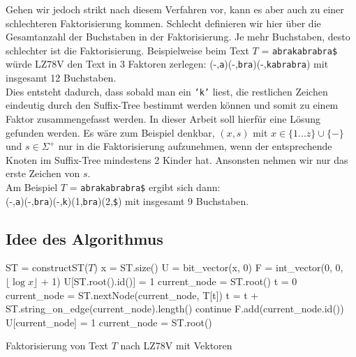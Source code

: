 \documentclass[a4paper,11pt]{scrartcl}%
\theoremstyle{change}
\theoremstyle{nonumberplain}
\theoremstyle{change}
\theoremstyle{nonumberplain}
\theoremstyle{change}
\theoremstyle{nonumberplain}
\begin{document}
	
	
	
	
	
	Gehen wir jedoch strikt nach diesem Verfahren vor, kann es aber auch zu einer schlechteren Faktorisierung kommen. Schlecht definieren wir hier über die Gesamtanzahl der Buchstaben in der Faktorisierung. Je mehr Buchstaben, desto schlechter ist die Faktorisierung.  Beispielweise beim Text $T$ = \texttt{abrakabrabra\$} würde LZ78V den Text in 3 Faktoren zerlegen: (-,\texttt{a})(-,\texttt{bra})(-,\texttt{kabrabra}) mit insgesamt 12 Buchstaben.\\
	Dies entsteht dadurch, dass sobald man ein \texttt{'k'} liest, die restlichen Zeichen eindeutig durch den Suffix-Tree bestimmt werden können und somit zu einem Faktor zusammengefasst werden. In dieser Arbeit soll hierfür eine Lösung gefunden werden. Es wäre zum Beispiel denkbar, $(x,s)$ mit $x \in \{1...z\} \cup \{-\}$ und $s \in \Sigma^{+}$ nur in die Faktorisierung aufzunehmen, wenn der entsprechende Knoten im Suffix-Tree mindestens 2 Kinder hat. Ansonsten nehmen wir nur das erste Zeichen von $s$.\\ Am Beispiel $T$ = \texttt{abrakabrabra\$} ergibt sich dann:\\
	(-,\texttt{a})(-,\texttt{bra})(-,\texttt{k})(1,\texttt{bra})(2,\texttt{\$}) mit insgesamt 9 Buchstaben.

	
	\subsection{Idee des Algorithmus}
	
		\begin{algorithm}[H]
		\begin{algorithmic}
			\STATE ST = constructST($T$) 
			\STATE x = ST.size()
			\STATE U = bit\_vector(x, 0) 
			\STATE F = int\_vector(0, 0, $\lfloor \log x\rfloor$ + 1) 
			\STATE U[ST.root().id()] = 1 
			\STATE current\_node = ST.root() 
			\STATE t = 0
				\STATE current\_node = ST.nextNode(current\_node, T[t]) 
				\STATE t = t + ST.string\_on\_edge(current\_node).length() 
					\STATE continue 
				\ELSE
					\STATE F.add(current\_node.id()) 
					\STATE U[current\_node] = 1 
					\STATE current\_node = ST.root() 
				\ENDIF
			\ENDWHILE
		
			
		\end{algorithmic}	
		\caption{Faktorisierung von Text $T$ nach LZ78V mit Vektoren}
		\label{algoLZ78V1}
		\end{algorithm}
		
\end{document}
